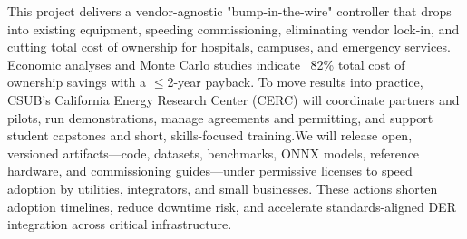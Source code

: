\documentclass[11pt]{article}
\begin{document}
This project delivers a vendor-agnostic "bump-in-the-wire" controller that drops into existing equipment, speeding commissioning, eliminating vendor lock-in, and cutting total cost of ownership for hospitals, campuses, and emergency services. Economic analyses and Monte Carlo studies indicate ~82\% total cost of ownership savings with a $\leq$2-year payback. To move results into practice, CSUB's California Energy Research Center (CERC) will coordinate partners and pilots, run demonstrations, manage agreements and permitting, and support student capstones and short, skills-focused training.We will release open, versioned artifacts—code, datasets, benchmarks, ONNX models, reference hardware, and commissioning guides—under permissive licenses to speed adoption by utilities, integrators, and small businesses. These actions shorten adoption timelines, reduce downtime risk, and accelerate standards-aligned DER integration across critical infrastructure.
\end{document}
